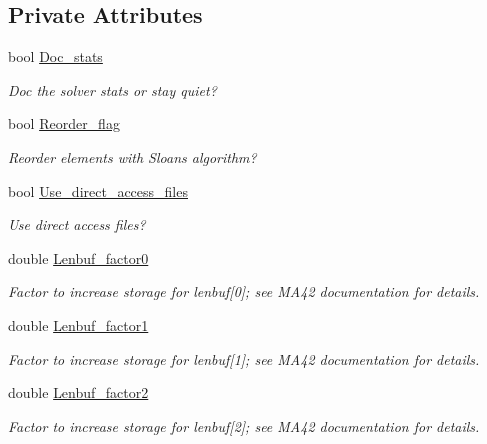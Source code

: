 \subsection*{Private Attributes}
\begin{DoxyCompactItemize}
\item 
bool \hyperlink{classoomph_1_1HSL__MA42_a186ee3391ad233b8150ef018578bf4d8}{Doc\+\_\+stats}
\begin{DoxyCompactList}\small\item\em Doc the solver stats or stay quiet? \end{DoxyCompactList}\item 
bool \hyperlink{classoomph_1_1HSL__MA42_a3ed31f1e33f586e5fe9dc87f116e588f}{Reorder\+\_\+flag}
\begin{DoxyCompactList}\small\item\em Reorder elements with Sloan\textquotesingle{}s algorithm? \end{DoxyCompactList}\item 
bool \hyperlink{classoomph_1_1HSL__MA42_a2f3365a6349136a32fcb4096851f7a70}{Use\+\_\+direct\+\_\+access\+\_\+files}
\begin{DoxyCompactList}\small\item\em Use direct access files? \end{DoxyCompactList}\item 
double \hyperlink{classoomph_1_1HSL__MA42_ad75423bfeb4216b896623f1dd4238d19}{Lenbuf\+\_\+factor0}
\begin{DoxyCompactList}\small\item\em Factor to increase storage for lenbuf\mbox{[}0\mbox{]}; see M\+A42 documentation for details. \end{DoxyCompactList}\item 
double \hyperlink{classoomph_1_1HSL__MA42_a54b6950140ec309586c01d50dc1b86b6}{Lenbuf\+\_\+factor1}
\begin{DoxyCompactList}\small\item\em Factor to increase storage for lenbuf\mbox{[}1\mbox{]}; see M\+A42 documentation for details. \end{DoxyCompactList}\item 
double \hyperlink{classoomph_1_1HSL__MA42_a500112b3d3e08cae377a9775d0454ca9}{Lenbuf\+\_\+factor2}
\begin{DoxyCompactList}\small\item\em Factor to increase storage for lenbuf\mbox{[}2\mbox{]}; see M\+A42 documentation for details. \end{DoxyCompactList}\item 

\end{DoxyCompactItemize}
